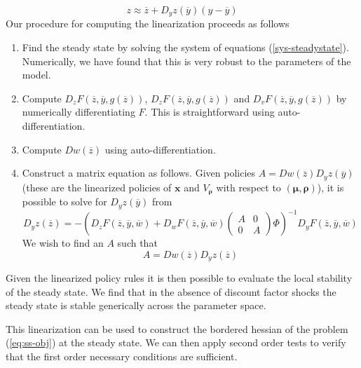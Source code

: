 \documentclass[thmsb,11pt]{article}
\newcommand{\bmat}{\begin{matrix}}
\newcommand{\emat}{\end{matrix}}
\newcommand{\ov}{\overline}
\begin{document}
\[
	z \approx \ov z + D_y z(\ov y)(y-\ov y)
\]Our procedure for computing the linearization proceeds as follows
	\begin{enumerate}
		\item Find the steady state by solving the system of equations (\ref{sys-steadystate}).  Numerically, we have found that this is very robust to the parameters of the model.
		\item  Compute $D_zF(\ov z,\ov y,g(\ov z))$, $D_zF(\ov z,\ov y,g(\ov z))$ and $D_vF(\ov z,\ov y,g(\ov z))$ by numerically differentiating $F$.  This is straightforward using auto-differentiation.
		\item  Compute $Dw(\ov z)$ using auto-differentiation.
		\item  Construct a matrix equation as follows.  Given policies $A = Dw(\ov z)D_yz(\ov y)$ (these are the linearized policies of $\bm x$ and $V_{\bm \rho}$ with respect to $(\bm \mu,\bm \rho)$), it is possible to solve for $D_yz(\ov y)$ from
		\[
			  D_y z(\ov z) =-\left(D_zF(\ov z,\ov y, \ov w)+D_w F(\ov z, \ov y, \ov w)\left(\bmat A &0\\0&A\emat\right)\Phi\right)^{-1}D_yF(\ov z,\ov y,\ov w)
		\]  We wish to find an $A$ such that
		\[
			A = Dw(\ov z)   D_y z(\ov z)
		\]
	\end{enumerate}
Given the linearized policy rules it is then possible to evaluate the local stability of the steady state.  We find that in the absence of discount factor shocks the steady state is stable generically across the parameter space.

This linearization can be used to construct the bordered hessian of the problem (\ref{eq:ss-obj}) at the steady state. We can then apply second order tests to verify that the first order necessary conditions are sufficient.
\end{document}
